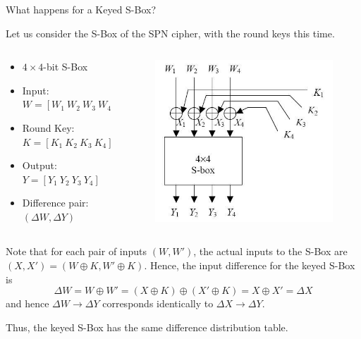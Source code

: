 \documentclass[9pt]{beamer}
\begin{document}
\begin{frame}
What happens for a Keyed S-Box?

\vspace{5mm}
\pause Let us consider the S-Box of the SPN cipher, with the round keys this time.
\pause
\begin{columns}
\begin{column}{0.5\textwidth}
\begin{itemize}
\item{$4 \times 4$-bit S-Box}
\item{Input: $W = [W_1 \: W_2 \: W_3 \: W_4]$}
\item{Round Key: $K = [K_1 \: K_2 \: K_3 \: K_4]$}
\item{Output: $Y = [Y_1 \: Y_2 \: Y_3 \: Y_4]$}
\item{Difference pair: $(\Delta W, \Delta Y)$}
\end{itemize}
\end{column}
\begin{column}{0.5\textwidth}
\begin{figure}
\includegraphics[totalheight=0.3\textheight]{spn_sbox_keyed.jpg}
\end{figure}
\end{column}
\end{columns}

\vspace{5mm}
\pause Note that for each pair of inputs $(W,W')$, the actual inputs to the S-Box are $(X,X') = (W \oplus K, W' \oplus K)$. Hence, the input difference for the keyed S-Box is 
\[ \Delta W = W \oplus W' = (X \oplus K) \oplus (X' \oplus K) = X \oplus X' = \Delta X \]
\pause and hence $\Delta W \rightarrow \Delta Y$ corresponds identically to $\Delta X \rightarrow \Delta Y$.

\vspace{2mm}
\pause Thus, the keyed S-Box has the same difference distribution table.
\end{frame}
\end{document}
